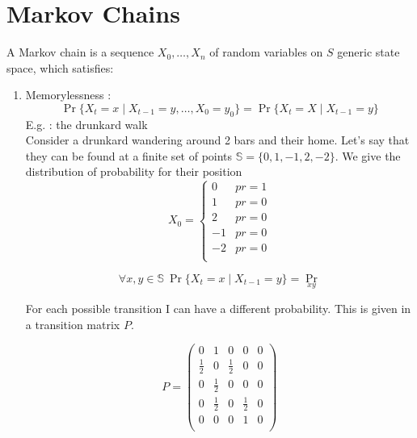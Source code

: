 \documentclass[]{article}
\begin{document}
\section{Markov Chains}
A Markov chain is a sequence $ X_0, \dots,X_n $ of random variables on $ S $ generic state space, which satisfies:
\begin{enumerate}
	\item Memorylessness :\[ \Pr\{X_t = x \mid X_{t-1} = y,\dots, X_{0} = y_0\} = \Pr\{X_t = X \mid X_{t-1} = y \}\]
	E.g. : the drunkard walk\\
	Consider a drunkard wandering around 2 bars and their home. Let's say that they can be found at a finite set of points $ \mathbb{S} = \{0, 1, -1, 2, -2\} $. We give the distribution of probability for their position
	\[
	X_0 = \begin{cases}
	0&pr = 1\\
	1&pr = 0\\
	2&pr = 0\\
	-1&pr = 0\\
	-2&pr = 0\\
	\end{cases}
	\]
	
	\[
	\forall x,y \in \mathbb{S}\ \Pr\{X_t =x \mid X_{t-1} = y\} = \Pr_{xy}
	\]
	
	For each possible transition I can have a different probability. This is given in a transition matrix $ P $.
	
	\[
	P=
	\left(
	\begin{matrix}
	0&1&0&0&0\\
	\frac{1}{2}&0&\frac{1}{2}&0&0\\
	0&\frac{1}{2}&0&0&0\\
	0&\frac{1}{2}&0&\frac{1}{2}&0\\
	0&0&0&1&0\\
	\end{matrix}\right)
	\]
	

\end{enumerate}
\end{document}
